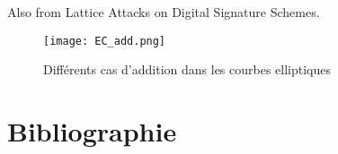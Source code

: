 \documentclass{backend}
\begin{document}
Also from Lattice Attacks on Digital Signature Schemes\cite{latAtk}.

\begin{figure}[h]
  \centering
  \texttt{[image: EC\_add.png]}
  \hfuzz=10pt
  \vspace{0cm}
  \caption{Différents cas d'addition dans les courbes elliptiques\cite{frwiki:218649671}}
  \label{fig:addition}
\end{figure}



\newpage
\section{Bibliographie}

\printbibliography
\end{document}
